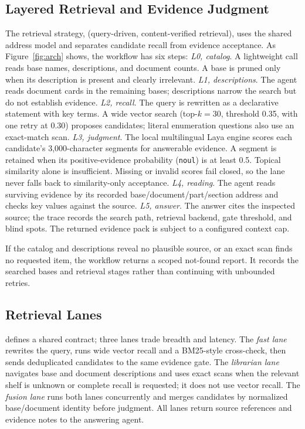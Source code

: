 \subsection{Layered Retrieval and Evidence Judgment}
\label{sec:ladder}
The retrieval strategy, \sys{} (query-driven, content-verified retrieval),
uses the shared address model and separates candidate recall from
evidence acceptance. As Figure~\ref{fig:arch} shows, the workflow has
six steps:
\emph{L0, catalog}. A lightweight call reads base names, descriptions,
and document counts. A base is pruned only when its description is
present and clearly irrelevant.
\emph{L1, descriptions}. The agent reads document cards in the remaining
bases; descriptions narrow the search but do not establish evidence.
\emph{L2, recall}. The query is rewritten as a declarative statement
with key terms. A wide vector search (top-$k=30$, threshold 0.35, with
one retry at 0.30) proposes candidates; literal enumeration questions
also use an exact-match scan.
\emph{L3, judgment}. The local multilingual Laya engine scores each
candidate's 3{,}000-character segments for answerable evidence. A
segment is retained when its positive-evidence probability
(\texttt{noul}) is at least 0.5. Topical similarity alone is
insufficient. Missing or invalid scores fail closed, so the lane never
falls back to similarity-only acceptance.
\emph{L4, reading}. The agent reads surviving evidence by its recorded
base/document/part/section address and checks key values against the
source.
\emph{L5, answer}. The answer cites the inspected source; the trace
records the search path, retrieval backend, gate threshold, and
blind spots. The returned evidence pack is subject to a configured
context cap.

If the catalog and descriptions reveal no plausible source, or an exact
scan finds no requested item, the workflow returns a scoped not-found
report. It records the searched bases and retrieval stages rather than
continuing with unbounded retries.

\subsection{Retrieval Lanes}
\sys{} defines a shared contract; three lanes trade breadth and latency.
The \emph{fast lane} rewrites the query, runs wide vector recall and a
BM25-style cross-check, then sends deduplicated candidates to the same
evidence gate. The \emph{librarian lane} navigates base and document
descriptions and uses exact scans when the relevant shelf is unknown or
complete recall is requested; it does not use vector recall. The
\emph{fusion lane} runs both lanes concurrently and merges candidates
by normalized base/document identity before judgment. All lanes return
source references and evidence notes to the answering agent.

